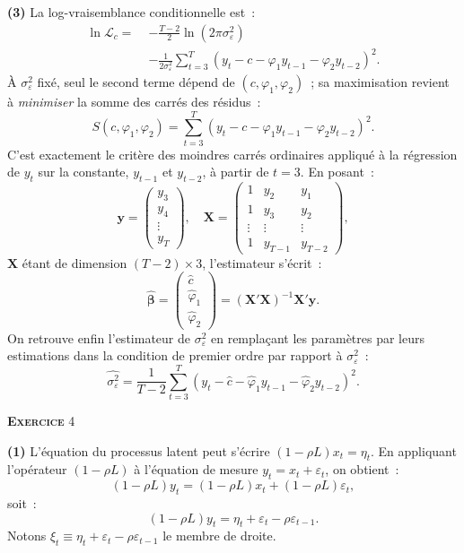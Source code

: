 \documentclass[11pt,a4paper,notitlepage]{article}
\newcommand{\exercice}[1]{\textsc{\textbf{Exercice}} #1}
\newcommand{\question}[1]{\textbf{(#1)}}
\begin{document}
\question{3} La log-vraisemblance conditionnelle est~:
\[
\begin{split}
\ln \mathcal L_c =\;& -\frac{T-2}{2}\ln(2\pi\sigma_{\varepsilon}^2) \\
&- \frac{1}{2\sigma_{\varepsilon}^2}\sum_{t=3}^T (y_t - c - \varphi_1 y_{t-1} - \varphi_2 y_{t-2})^2.
\end{split}
\]
À $\sigma_{\varepsilon}^2$ fixé, seul le second terme dépend de
$(c,\varphi_1,\varphi_2)$~; sa maximisation revient à \emph{minimiser}
la somme des carrés des résidus~:
\[
S(c,\varphi_1,\varphi_2) = \sum_{t=3}^T (y_t - c - \varphi_1 y_{t-1} - \varphi_2 y_{t-2})^2.
\]
C'est exactement le critère des moindres carrés ordinaires appliqué à
la régression de $y_t$ sur la constante, $y_{t-1}$ et $y_{t-2}$, à
partir de $t=3$. En posant~:
\[
\bm{y} = \begin{pmatrix} y_3 \\ y_4 \\ \vdots \\ y_T \end{pmatrix},\quad
\bm{X} = \begin{pmatrix} 1 & y_2 & y_1 \\ 1 & y_3 & y_2 \\ \vdots & \vdots & \vdots \\ 1 & y_{T-1} & y_{T-2} \end{pmatrix},
\]
$\bm{X}$ étant de dimension $(T-2)\times 3$, l'estimateur s'écrit~:
\[
\widehat{\bm\beta} = \begin{pmatrix} \hat c \\ \hat \varphi_1 \\ \hat \varphi_2 \end{pmatrix}
= (\bm{X}'\bm{X})^{-1}\bm{X}'\bm{y}.
\]
On retrouve enfin l'estimateur de $\sigma_{\varepsilon}^2$ en
remplaçant les paramètres par leurs estimations dans la condition de
premier ordre par rapport à $\sigma_{\varepsilon}^2$~:
\[
\widehat{\sigma_{\varepsilon}^2} = \frac{1}{T-2}\sum_{t=3}^T \left(y_t - \hat c - \hat\varphi_1 y_{t-1} - \hat\varphi_2 y_{t-2}\right)^2.
\]

\bigskip

\exercice{4}\newline

\question{1} L'équation du processus latent peut s'écrire $(1-\rho L)
x_t = \eta_t$. En appliquant l'opérateur $(1-\rho L)$ à l'équation de
mesure $y_t = x_t + \varepsilon_t$, on obtient~:
\[
(1-\rho L) y_t = (1-\rho L) x_t + (1-\rho L)\varepsilon_t,
\]
soit~:
\[
(1-\rho L) y_t = \eta_t + \varepsilon_t - \rho\varepsilon_{t-1}.
\]
Notons $\xi_t \equiv \eta_t + \varepsilon_t - \rho\varepsilon_{t-1}$
le membre de droite.\newline
\end{document}
